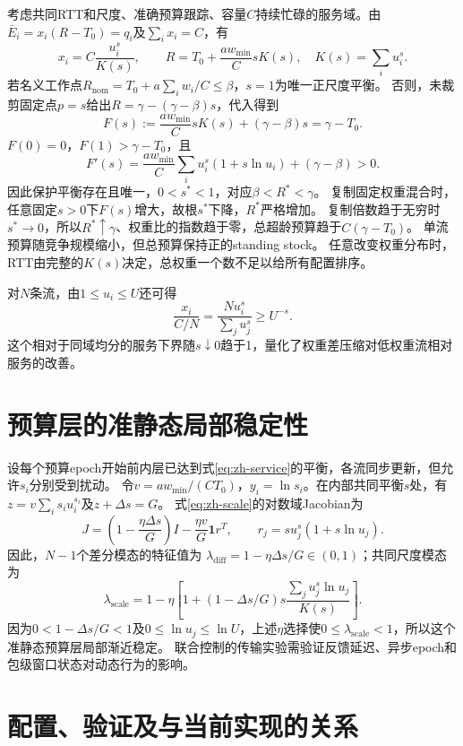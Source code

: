 \documentclass[10pt,a4paper]{ctexart}
\begin{document}
考虑共同RTT和尺度、准确预算跟踪、容量$C$持续忙碌的服务域。由$\bar E_i=x_i(R-T_0)=q_i$及$\sum_i x_i=C$，有
\begin{equation}
 x_i=C\frac{u_i^s}{K(s)},\qquad
 R=T_0+\frac{a w_{\min}}{C}sK(s),\quad K(s)=\sum_i u_i^s.
 \label{eq:zh-service}
\end{equation}
若名义工作点$R_{\mathrm{nom}}=T_0+a\sum_iw_i/C\le\beta$，$s=1$为唯一正尺度平衡。
否则，未裁剪固定点$p=s$给出$R=\gamma-(\gamma-\beta)s$，代入得到
\begin{equation}
 F(s):=\frac{a w_{\min}}C sK(s)+(\gamma-\beta)s=\gamma-T_0.
 \label{eq:zh-root}
\end{equation}
$F(0)=0$，$F(1)>\gamma-T_0$，且
\[
 F'(s)=\frac{a w_{\min}}C\sum_i u_i^s(1+s\ln u_i)+(\gamma-\beta)>0.
\]
因此保护平衡存在且唯一，$0<s^*<1$，对应$\beta<R^*<\gamma$。
复制固定权重混合时，任意固定$s>0$下$F(s)$增大，故根$s^*$下降，$R^*$严格增加。
复制倍数趋于无穷时$s^*\to0$，所以$R^*\uparrow\gamma$、权重比的指数趋于零，总超龄预算趋于$C(\gamma-T_0)$。
单流预算随竞争规模缩小，但总预算保持正的standing stock。
任意改变权重分布时，RTT由完整的$K(s)$决定，总权重一个数不足以给所有配置排序。

对$N$条流，由$1\le u_i\le U$还可得
\[
 \frac{x_i}{C/N}=\frac{N u_i^s}{\sum_j u_j^s}\ge U^{-s}.
\]
这个相对于同域均分的服务下界随$s\downarrow0$趋于1，量化了权重差压缩对低权重流相对服务的改善。

\section{预算层的准静态局部稳定性}

设每个预算epoch开始前内层已达到式\eqref{eq:zh-service}的平衡，各流同步更新，但允许$s_i$分别受到扰动。
令$v=a w_{\min}/(CT_0)$，$y_i=\ln s_i$。在内部共同平衡$s$处，有$z=v\sum_i s_i u_i^{s_i}$及$z+\Delta s=G$。
式\eqref{eq:zh-scale}的对数域Jacobian为
\[
 J=\left(1-\frac{\eta\Delta s}{G}\right)I
 -\frac{\eta v}{G}\mathbf1 r^T,
 \qquad r_j=s u_j^s(1+s\ln u_j).
\]
因此，$N-1$个差分模态的特征值为
$\lambda_{\mathrm{diff}}=1-\eta\Delta s/G\in(0,1)$；共同尺度模态为
\[
 \lambda_{\mathrm{scale}}
 =1-\eta\left[1+
  (1-\Delta s/G)s\frac{\sum_j u_j^s\ln u_j}{K(s)}\right].
\]
因为$0<1-\Delta s/G<1$及$0\le\ln u_j\le\ln U$，上述$\eta$选择使$0\le\lambda_{\mathrm{scale}}<1$，所以这个准静态预算层局部渐近稳定。
联合控制的传输实验需验证反馈延迟、异步epoch和包级窗口状态对动态行为的影响。

\section{配置、验证及与当前实现的关系}
\end{document}
